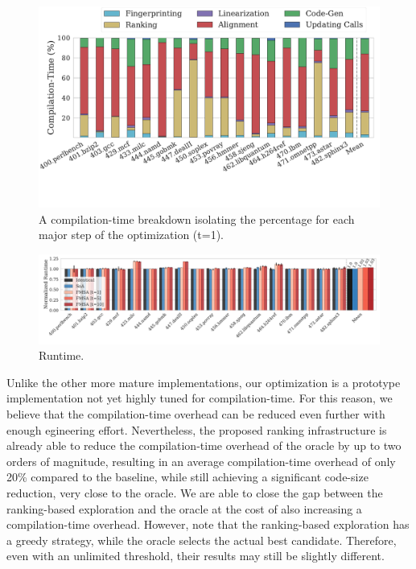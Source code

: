 \begin{figure}[t]
  \centering
  \includegraphics[width=1.0\linewidth]{figs/compilation-time-breakdown-sqrd.pdf}
  \vspace{-8.5ex}
  \caption{A compilation-time breakdown isolating the percentage for each major
           step of the optimization (t=1).}%
  \label{fig:compilation-time-breakdown}
\end{figure}

\begin{figure}[t]
  \centering
  \includegraphics[width=\linewidth]{figs/runtime-impact.pdf}
  \vspace{-4ex}
  \caption{Runtime.}
  \label{fig:runtime-impact}
\end{figure}

Unlike the other more mature implementations, our optimization is a prototype
implementation not yet highly tuned for compilation-time.
For this reason, we believe that the compilation-time overhead can be reduced
even further with enough egineering effort.
Nevertheless, the proposed ranking infrastructure is already able to reduce the
compilation-time overhead of the oracle by up to two orders of magnitude,
resulting in  an average compilation-time overhead of only 20\% compared to the
baseline, while still achieving a significant code-size reduction, very close to
the oracle.
We are able to close the gap between the ranking-based exploration and the
oracle at the cost of also increasing a compilation-time overhead.
However, note that the ranking-based exploration has a greedy strategy, while
the oracle selects the actual best candidate.
Therefore, even with an unlimited threshold, their results may still be slightly
different.

